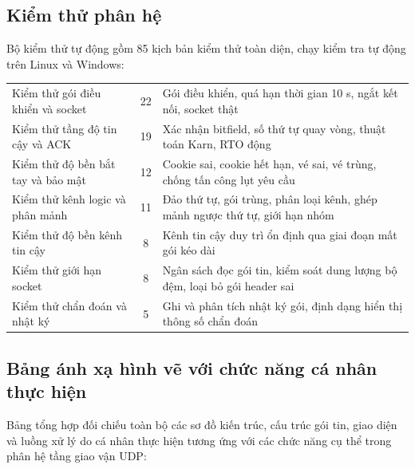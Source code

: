 \subsection{Kiểm thử phân hệ}
Bộ kiểm thử tự động gồm 85 kịch bản kiểm thử toàn diện, chạy kiểm tra tự động trên Linux và Windows:
\begin{center}\small
\begin{tabularx}{\linewidth}{|L{4.6cm}|c|Y|}
\hline
{} &  &  \\ \hline
Kiểm thử gói điều khiển và socket & 22 & Gói điều khiển, quá hạn thời gian 10 s, ngắt kết nối, socket thật \\ \hline
Kiểm thử tầng độ tin cậy và ACK & 19 & Xác nhận bitfield, số thứ tự quay vòng, thuật toán Karn, RTO động \\ \hline
Kiểm thử độ bền bắt tay và bảo mật & 12 & Cookie sai, cookie hết hạn, vé sai, vé trùng, chống tấn công lụt yêu cầu \\ \hline
Kiểm thử kênh logic và phân mảnh & 11 & Đảo thứ tự, gói trùng, phân loại kênh, ghép mảnh ngược thứ tự, giới hạn nhóm \\ \hline
Kiểm thử độ bền kênh tin cậy & 8 & Kênh tin cậy duy trì ổn định qua giai đoạn mất gói kéo dài \\ \hline
Kiểm thử giới hạn socket & 8 & Ngân sách đọc gói tin, kiểm soát dung lượng bộ đệm, loại bỏ gói header sai \\ \hline
Kiểm thử chẩn đoán và nhật ký & 5 & Ghi và phân tích nhật ký gói, định dạng hiển thị thông số chẩn đoán \\ \hline
\end{tabularx}
\end{center}

\subsection{Bảng ánh xạ hình vẽ với chức năng cá nhân thực hiện}
\label{sec:B-mapping-hinh-ve}
Bảng tổng hợp đối chiếu toàn bộ các sơ đồ kiến trúc, cấu trúc gói tin, giao diện và luồng xử lý do cá nhân thực hiện tương ứng với các chức năng cụ thể trong phân hệ tầng giao vận UDP:

